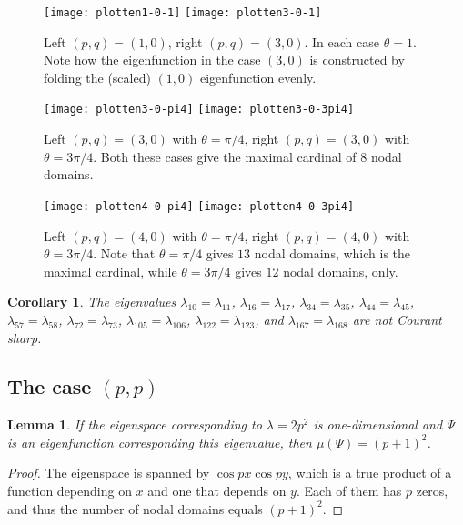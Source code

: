 \documentclass[a4paper,reqno,11pt]{amsart}
\newtheorem{lemma}[thm]{Lemma}
\newtheorem{cor}[thm]{Corollary}
\theoremstyle{remark}
\theoremstyle{definition}
\numberwithin{equation}{section}
\begin{document}
\begin{figure}[htp]
\centering
\texttt{[image: plotten1-0-1]}
\hskip 2cm
\texttt{[image: plotten3-0-1]}
\caption{Left $(p,q)=(1,0)$, right $(p,q)=(3,0)$. In each case $\theta=1$. Note
how the eigenfunction in the case $(3,0)$ is constructed by folding the
(scaled) $(1,0)$ eigenfunction evenly.}
\label{fig:3-0-1}
\end{figure}

\begin{figure}[htp]
\centering
\texttt{[image: plotten3-0-pi4]}
\hskip 2cm
\texttt{[image: plotten3-0-3pi4]}
\caption{Left $(p,q)=(3,0)$ with $\theta=\pi/4$, right $(p,q)=(3,0)$ with $\theta=3\pi/4$. Both these cases give the maximal cardinal of  $8$ nodal domains.}
\label{fig:3-0-special}
\end{figure}

\begin{figure}[htp]
\centering
\texttt{[image: plotten4-0-pi4]}
\hskip 2cm
\texttt{[image: plotten4-0-3pi4]}
\caption{Left $(p,q)=(4,0)$ with $\theta=\pi/4$, right $(p,q)=(4,0)$ with $\theta=3\pi/4$. Note that $\theta=\pi/4$ gives $13$ nodal domains, which is the maximal cardinal, while $\theta=3\pi/4$ gives $12$ nodal domains, only.}
\label{fig:4-0-special}
\end{figure}

\begin{cor}
\label{cor:p0}
The eigenvalues
$\lambda_{10}=\lambda_{11}$,
$\lambda_{16}=\lambda_{17}$,
$\lambda_{34}=\lambda_{35}$,
$\lambda_{44}=\lambda_{45}$,
$\lambda_{57}=\lambda_{58}$,
$\lambda_{72}=\lambda_{73}$,
$\lambda_{105}=\lambda_{106}$,
$\lambda_{122}=\lambda_{123}$, and
$\lambda_{167}=\lambda_{168}$
are not Courant sharp.
\end{cor}

\subsection{The case $(p,p)$}
\begin{lemma} 
\label{lem:pp}
 If the eigenspace corresponding to $\lambda=2p^2$ is one-dimensional
and $\Psi$ is an eigenfunction corresponding this eigenvalue, 
then $\mu(\Psi)=(p+1)^2$.
\end{lemma}
\begin{proof}
The eigenspace is spanned by $\cos px\cos py$, which
is a true product of a function depending on $x$ and one that depends on $y$.
Each of them has $p$ zeros, and thus the number of nodal domains equals 
$(p+1)^2$.
\end{proof}
\end{document}
